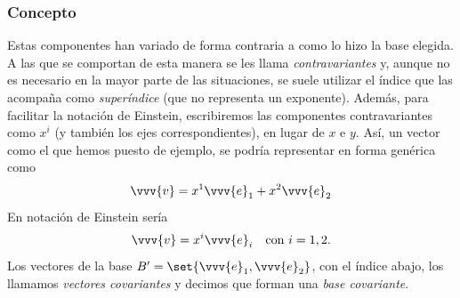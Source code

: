 \subsubsection{Concepto}
Estas componentes han variado de forma contraria a como lo hizo la base elegida.
A las que se comportan de esta manera se les llama \emph{contravariantes} y, aunque no
es necesario en la mayor parte de las situaciones, se suele utilizar el índice que las
acompaña como \emph{superíndice} (que no representa un exponente).
Además, para facilitar la notación de Einstein, escribiremos las componentes
contravariantes como $x^i$ (y también los ejes correspondientes), en lugar de $x$ e $y$.
Así, un vector como el que hemos puesto de ejemplo, se podría representar en forma
genérica como
\[
  \vvv{v} = x^1\vvv{e}_1 + x^2\vvv{e}_2
\]
En notación de Einstein sería
\[
  \vvv{v} = x^i\vvv{e}_i
  \hspace{1em}\text{con } i=1,2\text{.}
\]
Los vectores de la base  $B'=\set{\vvv{e}_1, \vvv{e}_2}$, con el índice abajo, los
llamamos \emph{vectores covariantes} y decimos que forman una \emph{base covariante}.


